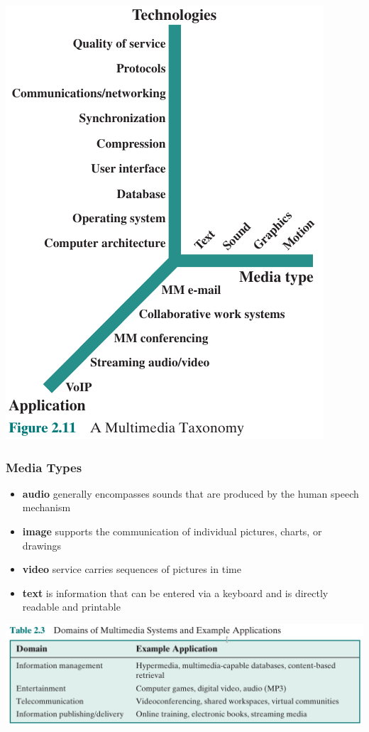 \documentclass[pdflatex,compress]{beamer}
\begin{document}
\begin{frame}
	\begin{center}
		\includegraphics[height=0.9\textheight]{img/img14}
	\end{center}
\end{frame}

\begin{frame}
	\frametitle{Media Types}
	\begin{itemize}
		\item \textbf{audio} generally encompasses sounds that are produced by the human speech mechanism
		\item \textbf{image} supports the communication of individual pictures, charts, or drawings
		\item \textbf{video} service carries sequences of pictures in time
		\item \textbf{text} is information that can be entered via a keyboard and is directly readable and printable
	\end{itemize}
\end{frame}

\begin{frame}
	\begin{center}
		\includegraphics[width=\linewidth]{img/img15}
	\end{center}
\end{frame}
\end{document}
